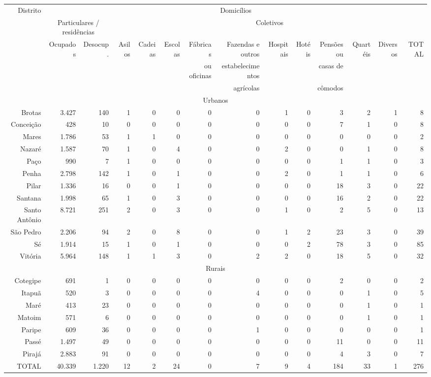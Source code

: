 \begin{sidewaystable}[!htp]
{
\begin{tiny}
\begin{tabular}{rrrrrrrrrrrrrr}
\hline
\multirow{3}{*}{Distrito} & \multicolumn{13}{c}{Domicílios}\\
\cline{2-14}
 & \multicolumn{2}{c|}{Particulares / residências} & \multicolumn{11}{c}{Coletivos} \\
\cline{2-14}
 & Ocupados & Desocup. & Asilos & Cadeias & Escolas & Fábricas& Fazendas e outros & Hospitais & Hotéis & Pensões ou & Quartéis & Diversos & TOTAL \\
 & & & & & & ou oficinas & estabelecimentos & & & casas de & & & \\
 & & & & & & & agrícolas & & & cômodos & & & \\
\hline
\multicolumn{14}{c}{Urbanos} \\
\hline
Brotas	&3.427	&140	&1	&0	&0	&0	&0	&1	&0	&3	&2	&1	&8\\
Conceição	&428	&10	&0	&0	&0	&0	&0	&0	&0	&7	&1	&0	&8\\
Mares	&1.786	&53	&1	&1	&0	&0	&0	&0	&0	&0	&0	&0	&2\\
Nazaré	&1.587	&70	&1	&0	&4	&0	&0	&2	&0	&0	&1	&0	&8\\
Paço	&990	&7	&1	&0	&0	&0	&0	&0	&0	&1	&1	&0	&3\\
Penha	&2.798	&142	&1	&0	&1	&0	&0	&2	&0	&1	&1	&0	&6\\
Pilar	&1.336	&16	&0	&0	&1	&0	&0	&0	&0	&18	&3	&0	&22\\
Santana	&1.998	&65	&1	&0	&3	&0	&0	&0	&0	&16	&2	&0	&22\\
Santo Antônio	&8.721	&251	&2	&0	&3	&0	&0	&1	&0	&2	&5	&0	&13\\
São Pedro	&2.206	&94	&2	&0	&8	&0	&0	&1	&2	&23	&3	&0	&39\\
Sé	&1.914	&15	&1	&0	&1	&0	&0	&0	&2	&78	&3	&0	&85\\
Vitória	&5.964	&148	&1	&1	&3	&0	&2	&2	&0	&18	&5	&0	&32\\
\hline
\multicolumn{14}{c}{Rurais} \\
\hline
Cotegipe	&691	&1	&0	&0	&0	&0	&0	&0	&0	&2	&0	&0	&2\\
Itapuã	&520	&3	&0	&0	&0	&0	&4	&0	&0	&0	&1	&0	&5\\
Maré	&413	&23	&0	&0	&0	&0	&0	&0	&0	&0	&1	&0	&1\\
Matoim	&571	&6	&0	&0	&0	&0	&0	&0	&0	&0	&1	&0	&1\\
Paripe	&609	&36	&0	&0	&0	&0	&1	&0	&0	&0	&0	&0	&1\\
Passé	&1.497	&49	&0	&0	&0	&0	&0	&0	&0	&11	&0	&0	&11\\
Pirajá	&2.883	&91	&0	&0	&0	&0	&0	&0	&0	&4	&3	&0	&7\\
\hline
TOTAL	&40.339	&1.220	&12	&2	&24	&0	&7	&9	&4	&184	&33	&1	&276\\
\hline
\end{tabular} 
\end{tiny}
}
{}
\end{sidewaystable}